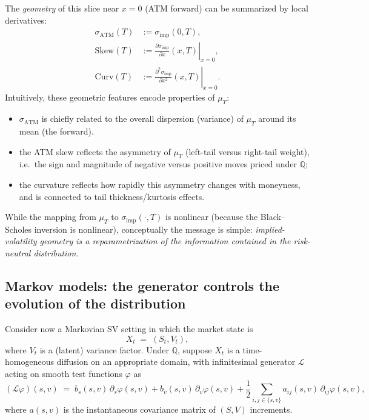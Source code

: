 \documentclass[11pt,a4paper]{report}
\begin{document}
The \emph{geometry} of this slice near $x=0$ (ATM forward) can be summarized by local derivatives:
\begin{align}
\sigma_{\mathrm{ATM}}(T) &:= \sigma_{\mathrm{imp}}(0,T),\\
\mathrm{Skew}(T) &:= \left.\frac{\partial \sigma_{\mathrm{imp}}}{\partial x}(x,T)\right|_{x=0},\\
\mathrm{Curv}(T) &:= \left.\frac{\partial^2 \sigma_{\mathrm{imp}}}{\partial x^2}(x,T)\right|_{x=0}.
\end{align}
Intuitively, these geometric features encode properties of $\mu_T$:
\begin{itemize}
\item $\sigma_{\mathrm{ATM}}$ is chiefly related to the overall dispersion (variance) of $\mu_T$ around its mean (the forward).
\item the ATM skew reflects the asymmetry of $\mu_T$ (left-tail versus right-tail weight), i.e.\ the sign and magnitude of negative versus positive moves priced under $\mathbb{Q}$;
\item the curvature reflects how rapidly this asymmetry changes with moneyness, and is connected to tail thickness/kurtosis effects.
\end{itemize}
While the mapping from $\mu_T$ to $\sigma_{\mathrm{imp}}(\cdot,T)$ is nonlinear (because the Black--Scholes inversion is nonlinear), conceptually the message is simple: \emph{implied-volatility geometry is a reparametrization of the information contained in the risk-neutral distribution.}

\subsection{Markov models: the generator controls the evolution of the distribution}
Consider now a Markovian SV setting in which the market state is
\begin{equation}
X_t \;=\; (S_t,V_t),
\end{equation}
where $V_t$ is a (latent) variance factor.
Under $\mathbb{Q}$, suppose $X_t$ is a time-homogeneous diffusion on an appropriate domain, with infinitesimal generator $\mathcal{L}$ acting on smooth test functions $\varphi$ as
\begin{equation}
(\mathcal{L}\varphi)(s,v)
\;=\;
b_s(s,v)\,\partial_s\varphi(s,v)
+
b_v(s,v)\,\partial_v\varphi(s,v)
+\frac{1}{2}\sum_{i,j\in\{s,v\}} a_{ij}(s,v)\,\partial_{ij}\varphi(s,v),
\label{eq:generator_general}
\end{equation}
where $a(s,v)$ is the instantaneous covariance matrix of $(S,V)$ increments.
\end{document}
